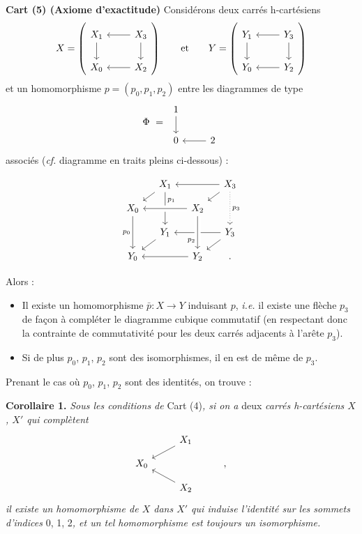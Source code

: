 \documentclass[11pt]{article}
\newcommand{\printedpage}[1]{\marginpar{\footnotesize p.~#1}}
\newcommand{\msp}[1]{\marginpar{\footnotesize [#1]}}
\begin{document}
\printedpage{4}

\textbf{Cart (5) (Axiome d'exactitude)} Considérons deux carrés h-cartésiens
\[
X = \left(\begin{tikzcd}
X_1 \ar[d] & X_3 \ar[l] \ar[d] \\
X_0 & X_2 \ar[l]
\end{tikzcd}\right)
\qquad \text{et} \qquad
Y = \left(\begin{tikzcd}
Y_1 \ar[d] & Y_3 \ar[l] \ar[d] \\
Y_0 & Y_2 \ar[l]
\end{tikzcd}\right)
\]
et un homomorphisme $p = (p_0, p_1, p_2)$ entre les diagrammes de type
\[
\Phi \ = \
\begin{tikzcd}
1 \ar[d] & \\
0 & 2 \ar[l]
\end{tikzcd}
\]
associés (\textit{cf.} diagramme en traits pleins ci-dessous) :

\msp{page 5}
\[
\begin{tikzcd}[row sep=small, column sep=small]
& X_1 \ar[dl] \ar[dd, "p_1" near start] & & X_3 \ar[ll] \ar[dl] \ar[dd, dotted, "p_3"] \\
X_0 \ar[dd, "p_0"'] & & X_2 \ar[ll, crossing over] & \\
& Y_1 \ar[dl] & & Y_3 \ar[ll] \ar[dl] \\
Y_0 & & Y_2 \ar[ll] \ar[from=uu, crossing over, "p_2"' near end] & .
\end{tikzcd}
\]

Alors :
\begin{itemize}[leftmargin=2.5em]
\item[a)] Il existe un homomorphisme $\bar{p} : X \longrightarrow Y$ induisant $p$, \textit{i.e.} il existe une flèche $p_3$ de façon à compléter le diagramme cubique commutatif (en respectant donc la contrainte de commutativité pour les deux carrés adjacents à l'arête $p_3$).
\item[b)] Si de plus $p_0$, $p_1$, $p_2$ sont des isomorphismes, il en est de même de $p_3$.
\end{itemize}

Prenant le cas où $p_0$, $p_1$, $p_2$ sont des identités, on trouve :

\textbf{Corollaire 1.} \textit{Sous les conditions de} Cart (4)\textit{, si on a} deux \textit{carrés h-cartésiens $X$, $X'$ qui complètent}
\[
\begin{tikzcd}[row sep=small]
& X_1 \ar[dl] & \\
X_0 & & , \\
& X_2 \ar[ul] &
\end{tikzcd}
\]
\textit{il existe un homomorphisme de $X$ dans $X'$ qui induise l'identité sur les sommets d'indices} 0, 1, 2\textit{, et un tel homomorphisme est toujours un isomorphisme.}
\end{document}
